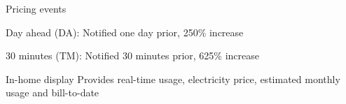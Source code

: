 \documentclass[aspectratio=169]{beamer}
\newenvironment{wideitemize}{\itemize\addtolength{\itemsep}{10pt}}{\enditemize}
\begin{document}
\begin{frame}{Pricing events}
    \begin{wideitemize}
        \item Day ahead (DA): Notified one day prior, 250\% increase
        \item 30 minutes (TM): Notified 30 minutes prior, 625\% increase
    \end{wideitemize}
    \center
\end{frame}

\begin{frame}{In-home display}
    Provides real-time usage, electricity price, estimated monthly usage and bill-to-date
\end{frame}
\end{document}
